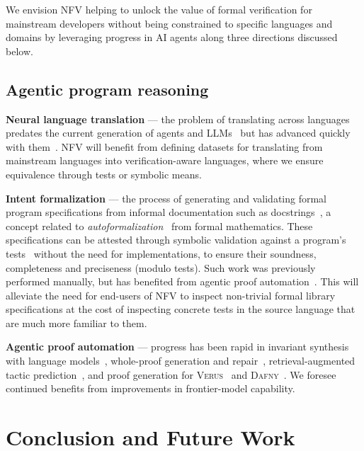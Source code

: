 \documentclass[11pt,letterpaper]{article}
\newcommand{\daf}{\textsc{Dafny}}
\begin{document}
We envision NFV helping to unlock the value of formal verification for mainstream developers without being
constrained to specific languages and domains by leveraging progress in AI agents along three directions
discussed below. 

\subsection{Agentic program reasoning}
 
\textbf{Neural language translation} --- the problem of translating across
languages predates the current generation of
agents and LLMs~\cite{roziere2020transcoder,roziere2022unittests,szafraniec2023compiler}
but has advanced quickly with them~\cite{yang2024unitrans}.
NFV will benefit from defining datasets for translating from mainstream languages 
into verification-aware languages, where we ensure equivalence through tests or 
symbolic means. 

\textbf{Intent formalization} --- the process of generating and validating 
formal program specifications from informal documentation such as docstrings~\cite{lahiri2026intent}, 
a concept related to \emph{autoformalization}~\cite{wu2022autoformalization} from formal mathematics.
These specifications can be attested through symbolic validation against
a program's tests~\cite{lahiri2024symbolic} without the need for implementations,
to ensure their soundness, completeness and preciseness (modulo tests).
Such work was previously performed manually, but has benefited from agentic proof automation~\cite{swamy2026spot}.
This will alleviate the need for end-users of NFV to inspect non-trivial formal library specifications 
at the cost of inspecting concrete tests in the source language that are much more familiar to them. 

\textbf{Agentic proof automation} --- progress has been rapid in invariant synthesis with 
language models~\cite{kamath2024loopy,wu2024lemur}, whole-proof generation and
repair~\cite{first2023baldur}, retrieval-augmented tactic
prediction~\cite{yang2023leandojo}, and proof generation for
\textsc{Verus}~\cite{yang2025autoverus} and \daf{}~\cite{misu2024dafny}. 
We foresee continued benefits from improvements in frontier-model capability.

\section{Conclusion and Future Work}
\label{sec:concl}
\end{document}
